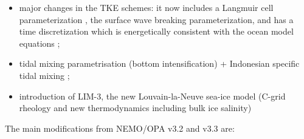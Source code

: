 \documentclass[../main/NEMO_manual]{subfiles}
\begin{document}
\begin{itemize}
\item
  major changes in the TKE schemes: it now includes a Langmuir cell parameterization \citep{Axell_JGR02},
  the \citet{Mellor_Blumberg_JPO04} surface wave breaking parameterization, and has a time discretization which
  is energetically consistent with the ocean model equations \citep{Burchard_OM02, Marsaleix_al_OM08};
\item
  tidal mixing parametrisation (bottom intensification) + Indonesian specific tidal mixing
  \citep{Koch-Larrouy_al_GRL07};
\item
  introduction of LIM-3, the new Louvain-la-Neuve sea-ice model
  (C-grid rheology and new thermodynamics including bulk ice salinity)
  \citep{Vancoppenolle_al_OM09a, Vancoppenolle_al_OM09b}
\end{itemize}

The main modifications from NEMO/OPA v3.2 and v3.3 are:
\end{document}
